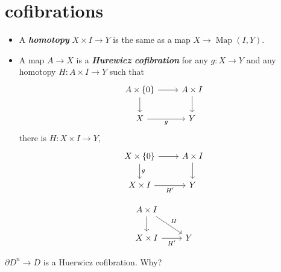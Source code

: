 \documentclass{article}
\numberwithin{equation}{section}
\DeclareMathOperator{\Map}{Map}
\begin{document}
\section{cofibrations}
\begin{itemize}
	\item A \textbf{\textit{homotopy}} $X\times I\to Y$ is the same as a map $X\to \Map(I,Y)$.
	\item A map $A\to X$ is a \textbf{\textit{Hurewicz cofibration}} for any $g:X\to Y$ and any homotopy $H:A\times I\to Y$ such that \[\begin{tikzcd}
		A\times\{0\}\arrow[r]\arrow[d]&A\times I\arrow[d]\\
		X\arrow[r,"g",swap]&Y
	\end{tikzcd}\]
	there is $H:X\times I\to Y$,
	\[\begin{tikzcd}
		X\times\{0\}\arrow[r]\arrow[d,"g"]&A\times I\arrow[d]\\
		X\times I\arrow[r,"H'",swap]&Y
	\end{tikzcd}\]
	
	\[\begin{tikzcd}
		A\times I\arrow[dr,"H"]\arrow[d]\\
		X\times I\arrow[r,"H'",swap]&Y
	\end{tikzcd}\]
\end{itemize}
\begin{example}
$\partial D^n\to D$ is a Huerwicz cofibration. {\color{orange} Why?}
\end{example}
\end{document}
